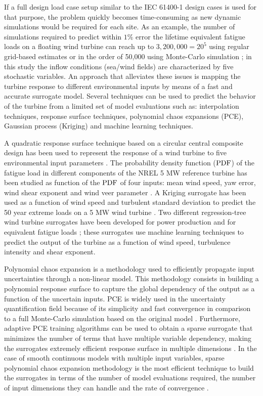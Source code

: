 \documentclass[preprint,12pt]{elsarticle}
\begin{document}
If a full design load case setup similar to the IEC 61400-1 design cases is used for that purpose, the problem quickly becomes time-consuming as new dynamic simulations would be required for each site. As an example, the number of simulations required to predict within $1\%$ error the lifetime equivalent fatigue loads on a floating wind turbine can reach up to $3,200,000=20^5$ using regular grid-based estimates or in the order of 50,000 using Monte-Carlo simulation \cite{graf2015high}; in this study the inflow conditions (sea/wind fields) are characterized by five stochastic variables. An approach that alleviates these issues is mapping the turbine response to different environmental inputs by means of a fast and accurate surrogate model. Several techniques can be used to predict the behavior of the turbine from a limited set of model evaluations such as: interpolation techniques, response surface techniques, polynomial chaos expansions (PCE), Gaussian process (Kriging) and machine learning techniques. 

A quadratic response surface technique based on a circular central composite design has been used to represent the response of a wind turbine to five environmental input parameters \cite{toft2016assessment}. The probability density function ($\mathrm{PDF}$) of the fatigue load in different components of the NREL 5 MW reference turbine has been studied as function of the $\mathrm{PDF}$ of four inputs: mean wind speed, yaw error, wind shear exponent and wind veer parameter \cite{TallwindReport}. A Kriging surrogate has been used as a function of wind speed and turbulent standard deviation to predict the 50 year extreme loads on a 5 MW wind turbine \cite{abdallah2016influence}. Two different regression-tree wind turbine surrogates have been developed for power production \cite{clifton2013using} and for equivalent fatigue loads \cite{clifton2014effect}; these surrogates use machine learning techniques to predict the output of the turbine as a function of wind speed, turbulence intensity and shear exponent.

Polynomial chaos expansion is a methodology used to efficiently propagate input uncertainties through a non-linear model. This methodology consists in building a polynomial response surface to capture the global dependency of the output as a function of the uncertain inputs. PCE is widely used in the uncertainty quantification field because of its simplicity and fast convergence in comparison to a full Monte-Carlo simulation based on the original model \cite{soize2004physical, le2004uncertainty, choi2004polynomial, berveiller2006stochastic, xiu2005high}. Furthermore, adaptive PCE training algorithms can be used to obtain a sparse surrogate that minimizes the number of terms that have multiple variable dependency, making the surrogates extremely efficient response surface in multiple dimensions  \cite{blatman2011adaptive,pedregosa2011scikit,tibshirani1996regression}. In the case of smooth continuous models with multiple input variables, sparse polynomial chaos expansion methodology is the most efficient technique to build the surrogates in terms of the number of model evaluations required, the number of input dimensions they can handle and the rate of convergence \cite{blatman2011adaptive}.
\end{document}
